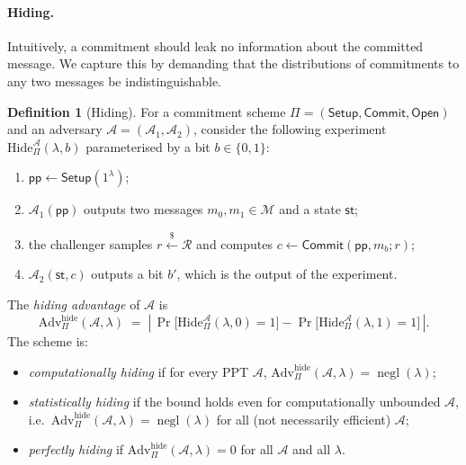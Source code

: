 \documentclass[11pt,a4paper]{article}
\theoremstyle{definition}
\newtheorem{definition}[theorem]{Definition}
\theoremstyle{remark}
\DeclareMathOperator{\negl}{negl}
\begin{document}
\paragraph{Hiding.}
Intuitively, a commitment should leak no information about the committed message. We capture this by demanding that the distributions of commitments to any two messages be indistinguishable.

\begin{definition}[Hiding]\label{commitments:def:hiding}
For a commitment scheme \(\Pi = (\mathsf{Setup}, \mathsf{Commit}, \mathsf{Open})\) and an adversary \(\mathcal{A} = (\mathcal{A}_1, \mathcal{A}_2)\), consider the following experiment \(\mathrm{Hide}^{\mathcal{A}}_{\Pi}(\lambda, b)\) parameterised by a bit \(b \in \{0,1\}\):
\begin{enumerate}
  \item \(\mathsf{pp} \gets \mathsf{Setup}(1^\lambda)\);
  \item \(\mathcal{A}_1(\mathsf{pp})\) outputs two messages \(m_0, m_1 \in \mathcal{M}\) and a state \(\mathsf{st}\);
  \item the challenger samples \(r \xleftarrow{\$} \mathcal{R}\) and computes \(c \gets \mathsf{Commit}(\mathsf{pp}, m_b; r)\);
  \item \(\mathcal{A}_2(\mathsf{st}, c)\) outputs a bit \(b'\), which is the output of the experiment.
\end{enumerate}
The \emph{hiding advantage} of \(\mathcal{A}\) is
\[
  \mathrm{Adv}^{\mathrm{hide}}_{\Pi}(\mathcal{A}, \lambda)
  \;=\;
  \left|\, \Pr\bigl[\mathrm{Hide}^{\mathcal{A}}_{\Pi}(\lambda, 0) = 1\bigr]
        - \Pr\bigl[\mathrm{Hide}^{\mathcal{A}}_{\Pi}(\lambda, 1) = 1\bigr] \,\right|.
\]
The scheme is:
\begin{itemize}
  \item \emph{computationally hiding} if for every PPT \(\mathcal{A}\), \(\mathrm{Adv}^{\mathrm{hide}}_{\Pi}(\mathcal{A}, \lambda) = \negl(\lambda)\);
  \item \emph{statistically hiding} if the bound holds even for computationally unbounded \(\mathcal{A}\), i.e.\ \(\mathrm{Adv}^{\mathrm{hide}}_{\Pi}(\mathcal{A}, \lambda) = \negl(\lambda)\) for all (not necessarily efficient) \(\mathcal{A}\);
  \item \emph{perfectly hiding} if \(\mathrm{Adv}^{\mathrm{hide}}_{\Pi}(\mathcal{A}, \lambda) = 0\) for all \(\mathcal{A}\) and all \(\lambda\).
\end{itemize}
\end{definition}
\end{document}
